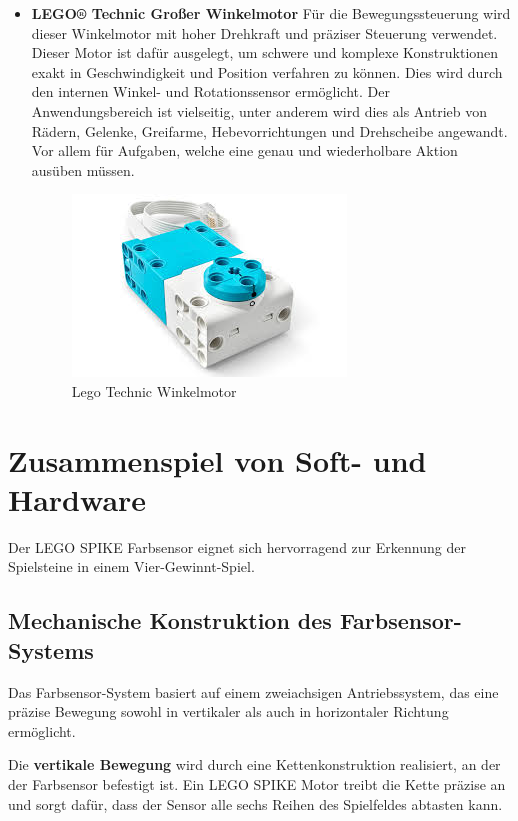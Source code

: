\begin{itemize}
	
	\item \textbf{LEGO® Technic Großer Winkelmotor}
	Für die Bewegungssteuerung wird dieser Winkelmotor mit hoher Drehkraft und präziser Steuerung verwendet. Dieser Motor ist dafür ausgelegt, um schwere und komplexe Konstruktionen exakt in Geschwindigkeit und Position verfahren zu können. Dies wird durch den internen Winkel- und Rotationssensor ermöglicht. Der Anwendungsbereich ist vielseitig, unter anderem wird dies als Antrieb von Rädern, Gelenke, Greifarme, Hebevorrichtungen und Drehscheibe angewandt. Vor allem für Aufgaben, welche eine genau und wiederholbare Aktion ausüben müssen.
	
	\begin{figure}[H]
		\centering
		\includegraphics[width=0.5\linewidth]{images/Motor}
		\caption{Lego Technic Winkelmotor}
		\label{fig:motor}
	\end{figure}
	
\end{itemize}

\section{Zusammenspiel von Soft- und Hardware}

Der LEGO SPIKE Farbsensor eignet sich hervorragend zur Erkennung der Spielsteine in einem Vier-Gewinnt-Spiel. 

\subsection{Mechanische Konstruktion des Farbsensor-Systems}

Das Farbsensor-System basiert auf einem zweiachsigen Antriebssystem, das eine präzise Bewegung sowohl in vertikaler als auch in horizontaler Richtung ermöglicht. 

Die \textbf{vertikale Bewegung} wird durch eine Kettenkonstruktion realisiert, an der der Farbsensor befestigt ist. Ein LEGO SPIKE Motor treibt die Kette präzise an und sorgt dafür, dass der Sensor alle sechs Reihen des Spielfeldes abtasten kann. 

